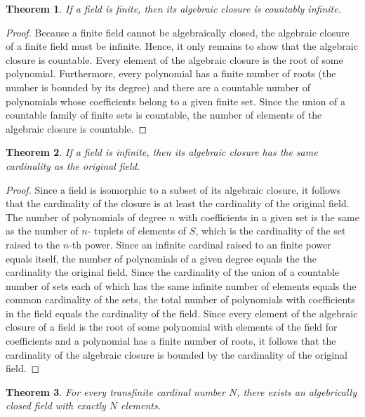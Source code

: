 \documentclass[12pt]{article}
\newtheorem{theorem}{Theorem}
\begin{document}
\begin{theorem}
If a field is finite, then its algebraic closure is countably infinite.
\end{theorem}

\begin{proof}
Because a finite field cannot be algebraically closed, the algebraic closure 
of a finite field must be infinite.  Hence, it only remains to show that the
algebraic closure is countable.  Every element of the algebraic closure is 
the root of some polynomial.  Furthermore, every polynomial
has a finite number of roots (the number is bounded by its degree) and there
are a countable number of polynomials whose coefficients belong to a given
finite set.  Since the union of a countable family of finite sets is 
countable, the number of elements of the algebraic closure is countable.
\end{proof}

\begin{theorem}
If a field is infinite, then its algebraic closure has the same cardinality
as the original field.
\end{theorem}

\begin{proof}
Since a field is isomorphic to a subset of its algebraic closure, it follows 
that the cardinality of the closure is at least the cardinality of the original field.  The number of polynomials of degree $n$ with coefficients in
a given set is the same as the number of $n$- tuplets of elements of $S$,
which is the cardinality of the set raised to the $n$-th power.  Since an
infinite cardinal raised to an finite power equals itself, the number of
polynomials of a given degree equals the the cardinality the original field.
Since the cardinality of the union of a countable number of sets each of
which has the same infinite number of elements equals the common cardinality 
of the sets, the total number of polynomials with coefficients in the field
equals the cardinality of the field.  Since every element of the algebraic
closure of a field is the root of some polynomial with elements of the
field for coefficients and a polynomial has a finite number of roots, it
follows that the cardinality of the algebraic closure is bounded by the
cardinality of the original field.
\end{proof}

\begin{theorem}
For every transfinite cardinal number $N$, there exists an algebrically
closed field with exactly $N$ elements.
\end{theorem}
\end{document}
